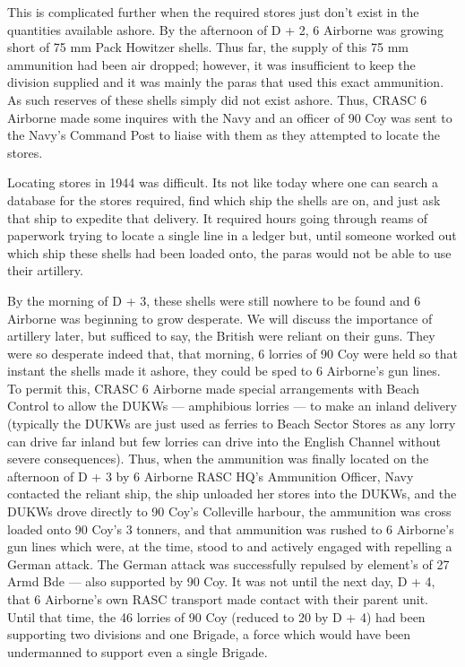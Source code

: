 \documentclass[noraggedright]{turabian-researchpaper}
\begin{document}
This is complicated further when the required stores just don't exist in the
quantities available ashore.  By the afternoon of D + 2, 6 Airborne was 
growing short of 75 mm Pack Howitzer shells.  Thus far, the supply of this 75 
mm ammunition had been air dropped; however, it was insufficient to keep the
division supplied and it was mainly the paras that used this exact ammunition.  
As such reserves of these shells simply did not exist ashore.  Thus, CRASC 6
Airborne made some inquires with the Navy and an officer of 90 Coy was sent to 
the Navy's Command Post to liaise with them as they attempted to locate the 
stores.\autocite[7]{90wdjun}

Locating stores in 1944 was difficult.  Its not like today where one can 
search a database for the stores required, find which ship the shells are on, 
and just ask that ship to expedite that delivery.  It required hours going 
through reams of paperwork trying to locate a single line in a ledger but, 
until 
someone worked out which ship these shells had been loaded onto, the paras
would not be able to use their artillery. 

By the morning of D + 3, these shells were still nowhere to be found and 6
Airborne was beginning to grow desperate.  We will discuss the importance of
artillery later, but sufficed to say, the British were reliant on their
guns.  They were so desperate indeed that, that morning, 6 lorries of 90 Coy
were held so that instant the shells made it 
ashore, they could be sped to 6 Airborne's gun lines.  To permit this, CRASC
6 Airborne made special arrangements with Beach Control to allow the DUKWs
--- amphibious lorries --- to make an inland delivery (typically the DUKWs
are just used as ferries to Beach Sector Stores as any lorry can drive far
inland but few lorries can drive into the English Channel without severe
consequences).  %
Thus, when the ammunition was finally located on the afternoon of D + 3 by
6 Airborne RASC HQ's Ammunition Officer, Navy contacted the reliant ship,
the ship unloaded her stores into the DUKWs, and the
DUKWs drove directly to 90 Coy's Colleville harbour, the ammunition was 
cross loaded onto 90 Coy's 3 tonners, and that ammunition was rushed to 6
Airborne's gun lines which were, at the time, stood to and actively engaged 
with repelling a German attack.\autocite[7-8]{90wdjun}
The German attack was successfully repulsed
by element's of 27 Armd Bde --- also supported by 90 Coy.  It was not until 
the next day, D + 4, that 6 Airborne's own RASC transport made contact with
their parent unit.  Until that time, the 46 lorries of 90 Coy (reduced to 20 
by D + 4) had been supporting two divisions and one Brigade, a force which 
would have been undermanned to support even a single Brigade.  
\end{document}
